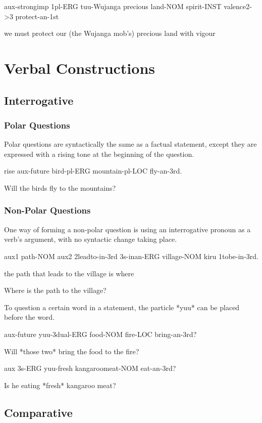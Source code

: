 aux-strongimp 1pl-ERG tuu-Wujanga precious land-NOM spirit-INST valence2->3
protect-an-1st

we must protect our (the Wujanga mob's) precious land with vigour

\section{Verbal Constructions}

\subsection{Interrogative}

\subsubsection{Polar Questions}

Polar questions are syntactically the same as a factual statement, except they
are expressed with a rising tone at the beginning of the question.

rise aux-future bird-pl-ERG mountain-pl-LOC fly-an-3rd.

Will the birds fly to the mountains?

\subsubsection{Non-Polar Questions}

One way of forming a non-polar question is using an interrogative pronoun as a
verb's argument, with no syntactic change taking place.

aux1 path-NOM aux2 2leadto-in-3rd 3s-inan-ERG village-NOM kiru 1tobe-in-3rd.

the path that leads to the village is where

Where is the path to the village?

To question a certain word in a statement, the particle *yuu* can be placed
before the word.

aux-future yuu-3dual-ERG food-NOM fire-LOC bring-an-3rd?

Will *those two* bring the food to the fire?

aux 3s-ERG yuu-fresh kangaroomeat-NOM eat-an-3rd?

Is he eating *fresh* kangaroo meat?

\subsection{Comparative}

